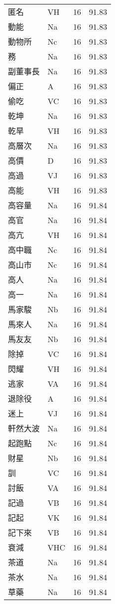 \documentclass[twocolumn]{book}
\begin{document}
\begin{supertabular}{llrr}
匿名 & VH & 16 &  91.83\\
動能 & Na & 16 &  91.83\\
動物所 & Nc & 16 &  91.83\\
務 & Na & 16 &  91.83\\
副董事長 & Na & 16 &  91.83\\
偏正 & A & 16 &  91.83\\
偷吃 & VC & 16 &  91.83\\
乾坤 & Na & 16 &  91.83\\
乾旱 & VH & 16 &  91.83\\
高層次 & Na & 16 &  91.83\\
高價 & D & 16 &  91.83\\
高過 & VJ & 16 &  91.83\\
高能 & VH & 16 &  91.83\\
高容量 & Na & 16 &  91.84\\
高官 & Na & 16 &  91.84\\
高亢 & VH & 16 &  91.84\\
高中職 & Nc & 16 &  91.84\\
高山市 & Nc & 16 &  91.84\\
高人 & Na & 16 &  91.84\\
高一 & Na & 16 &  91.84\\
馬家駿 & Nb & 16 &  91.84\\
馬來人 & Na & 16 &  91.84\\
馬友友 & Nb & 16 &  91.84\\
除掉 & VC & 16 &  91.84\\
閃耀 & VH & 16 &  91.84\\
逃家 & VA & 16 &  91.84\\
退除役 & A & 16 &  91.84\\
迷上 & VJ & 16 &  91.84\\
軒然大波 & Na & 16 &  91.84\\
起跑點 & Nc & 16 &  91.84\\
財星 & Nb & 16 &  91.84\\
訓 & VC & 16 &  91.84\\
討飯 & VA & 16 &  91.84\\
記過 & VB & 16 &  91.84\\
記起 & VK & 16 &  91.84\\
記下來 & VB & 16 &  91.84\\
衰減 & VHC & 16 &  91.84\\
茶道 & Na & 16 &  91.84\\
茶水 & Na & 16 &  91.84\\
草藥 & Na & 16 &  91.84\\

\end{supertabular}
\end{document}
